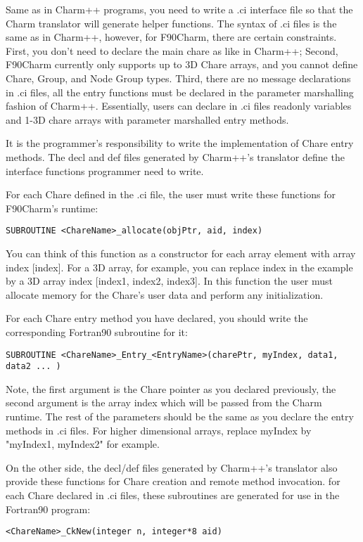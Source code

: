 \documentclass[11pt]{article}
\begin{document}
Same as in Charm++ programs, you need to write a .ci interface file
so that the Charm translator will generate helper functions. The syntax of .ci files
is the same as in Charm++, however, for F90Charm, there are certain
constraints. First, you don't need to declare the main chare as like in Charm++;
Second, F90Charm currently only supports up to 3D Chare arrays, and you cannot define 
Chare, Group, and Node Group types. Third, there are no message declarations in .ci files, 
all the entry functions must be declared in the parameter marshalling 
fashion of Charm++.
Essentially, users can declare in .ci files readonly variables and 1-3D
chare arrays with parameter marshalled entry methods.

It is the programmer's responsibility to write the implementation of Chare
entry methods. The decl and def files generated by Charm++'s translator define
the interface functions programmer need to write.

For each Chare defined in the .ci file, the user must write these functions
for F90Charm's runtime:

  \verb+SUBROUTINE <ChareName>_allocate(objPtr, aid, index)+

  You can think of this function as a constructor for each array element 
with array index [index]. For a 3D array, for example, you can replace index in the 
example by a 3D array index [index1, index2, index3]. 
In this function the user must allocate memory for 
the Chare's user data and perform any initialization.

  For each Chare entry method you have declared, you should write the corresponding 
Fortran90 subroutine for it:

  \verb+SUBROUTINE <ChareName>_Entry_<EntryName>(charePtr, myIndex, data1, data2 ... )+

  Note, the first argument is the Chare pointer as you declared previously, the second argument is the array index which will be passed from the Charm runtime. 
The rest of the parameters should be the same as you declare the entry methods
in .ci files. For higher dimensional arrays, replace myIndex by "myIndex1, myIndex2" for example.

On the other side, the decl/def files generated by Charm++'s translator also
provide these functions for Chare creation and remote method invocation. 
for each Chare declared in .ci files, these subroutines are generated for use
 in the Fortran90 program:

  \verb+<ChareName>_CkNew(integer n, integer*8 aid)+
\end{document}
